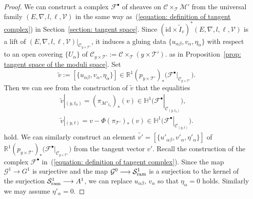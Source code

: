 \documentclass[pdftex]{sigma}
\numberwithin{equation}{section}
\begin{document}
\begin{proof}
We can construct a complex
${\mathcal F}^{\bullet}$ of sheaves on ${\mathcal C}\times_{\mathcal T}{\mathcal M'}$
from the universal family
$(E,\nabla,l,\ell,{\mathcal V})$
in the same way as~(\ref{equation: definition of tangent complex})
in Section~\ref{section: tangent space}.
Since $(\mathrm{id}\times \tilde{I}_v)^*(E,\nabla,l,\ell,{\mathcal V})$
is a lift of $(E,\nabla,l,\ell,{\mathcal V})|_{{\mathcal C}_{y\times{\mathcal T'}}}$,
it induces a gluing data
$\{u_{\alpha\beta},v_{\alpha},\eta_{\alpha}\}$
with respect to an open covering $\{U_{\alpha}\}$ of
${\mathcal C}_{y\times{\mathcal T'}}:={\mathcal C}\times_{\mathcal T}(y\times{\mathcal T'})$.
as in Proposition~\ref{prop: tangent space of the moduli space}.
Set
\[
 \tilde{v}:=[\{ u_{\alpha\beta}, v_{\alpha},\eta_{\alpha} \}]
 \in \mathbb{R}^1(p_{y\times{\mathcal T'}})_*
 \big( {\mathcal F}^{\bullet}| _{{\mathcal C}_{y\times{\mathcal T'}}} \big).
\]
Then we can see from the construction of $\tilde{v}$ that the equalities
\begin{gather*}
 \tilde{v}|_{(y,t_0)}
 =
 (\pi_{{\mathcal M'}_{t_0}})_*(v)
\in \mathbb{H}^1\big({\mathcal F}^{\bullet}|_{{\mathcal C}_{(y,t_0)}}\big),
 \\
\tilde{v}|_{(y,t)}
 =
 v-\Phi(\pi_{\mathcal T'})_*(v)
 \in \mathbb{H}^1\big({\mathcal F}^{\bullet}|_{{\mathcal C}_{(y,t)}}\big).
\end{gather*}
hold.
We can similarly construct an element
$\tilde{v'}=[\{ u'_{\alpha\beta}, v'_{\alpha},\eta'_{\alpha} \}]$ of
$\mathbb{R}^1(p_{y\times{\mathcal T'}})_*
\big( {\mathcal F}^{\bullet}| _{{\mathcal C}_{y\times{\mathcal T'}}} \big)$
from the tangent vector $v'$.
Recall the construction of the complex ${\mathcal F}^{\bullet}$
in~(\ref{equation: definition of tangent complex}).
Since the map ${\mathcal G}^1\longrightarrow G^1$ is surjective
and the map ${\mathcal G}^0 \longrightarrow {\mathcal S}^1_{\rm ram}$
is a surjection to the kernel of the surjection
${\mathcal S}^1_{\rm ram}\longrightarrow A^1$,
we can replace $u_{\alpha\beta}$, $v_{\alpha}$ so that
$\eta_{\alpha}=0$ holds.
Similarly we may assume $\eta'_{\alpha}=0$.


\end{proof}
\end{document}

